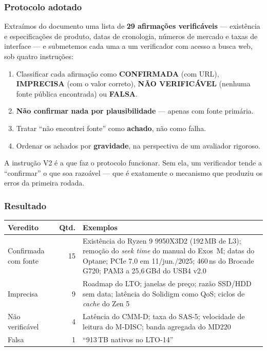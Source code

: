 \documentclass[11pt,a4paper]{article}
\begin{document}
\subsubsection*{Protocolo adotado}

Extraímos do documento uma lista de \textbf{29 afirmações verificáveis} --- existência e
especificações de produto, datas de cronologia, números de mercado e taxas de interface ---
e submetemos cada uma a um verificador com acesso a busca web, sob quatro instruções:

\begin{enumerate}[label=\textbf{V\arabic*.}]
\item Classificar cada afirmação como \textbf{CONFIRMADA} (com URL), \textbf{IMPRECISA} (com
      o valor correto), \textbf{NÃO VERIFICÁVEL} (nenhuma fonte pública encontrada) ou
      \textbf{FALSA}.
\item \textbf{Não confirmar nada por plausibilidade} --- apenas com fonte primária.
\item Tratar ``não encontrei fonte'' como \textbf{achado}, não como falha.
\item Ordenar os achados por \textbf{gravidade}, na perspectiva de um avaliador rigoroso.
\end{enumerate}

A instrução V2 é a que faz o protocolo funcionar. Sem ela, um verificador tende a
``confirmar'' o que soa razoável --- que é exatamente o mecanismo que produziu os erros da
primeira rodada.

\subsubsection*{Resultado}

\begin{center}\small
\begin{tabular}{@{}p{4.2cm}rp{9.0cm}@{}}
\toprule
\textbf{Veredito} & \textbf{Qtd.} & \textbf{Exemplos} \\
\midrule
Confirmada com fonte & 15 & Existência do Ryzen 9 9950X3D2 (192\,MB de L3); remoção do
\emph{seek time} do manual do Exos~M; datas do Optane; PCIe 7.0 em 11/jun./2025;
460\,ns do Brocade G720; PAM3 a 25,6\,GBd do USB4 v2.0 \\
Imprecisa & 9 & Roadmap do LTO; janelas de preço; razão SSD/HDD sem data; latência do
Solidigm como QoS; ciclos de \emph{cache} do Zen 5 \\
Não verificável & 4 & Latência do CMM-D; taxa do SAS-5; velocidade de leitura do M-DISC;
banda agregada do MD220 \\
Falsa & 1 & ``913\,TB nativos no LTO-14'' \\
\bottomrule
\end{tabular}
\end{center}
\end{document}
